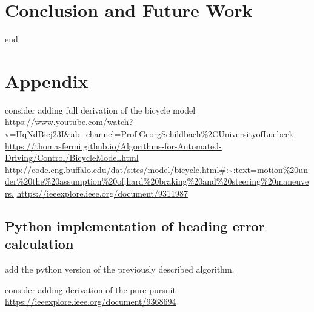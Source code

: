 \documentclass[a4paper,12pt,sort&compress]{article}
\begin{document}




\newpage
\section{Conclusion and Future Work}
end




\newpage
\section{Appendix}
consider adding full derivation of the bicycle model \url{https://www.youtube.com/watch?v=HqNdBiej23I&ab_channel=Prof.GeorgSchildbach%2CUniversityofLuebeck}
\url{https://thomasfermi.github.io/Algorithms-for-Automated-Driving/Control/BicycleModel.html}
\url{http://code.eng.buffalo.edu/dat/sites/model/bicycle.html#:~:text=motion%20under%20the%20assumption%20of,hard%20braking%20and%20steering%20maneuvers.}
\url{https://ieeexplore.ieee.org/document/9311987}

\subsection{Python implementation of heading error calculation}
add the python version of the previously described algorithm.

consider adding derivation of the pure pursuit
\url{https://ieeexplore.ieee.org/document/9368694}


\newpage
\end{document}
